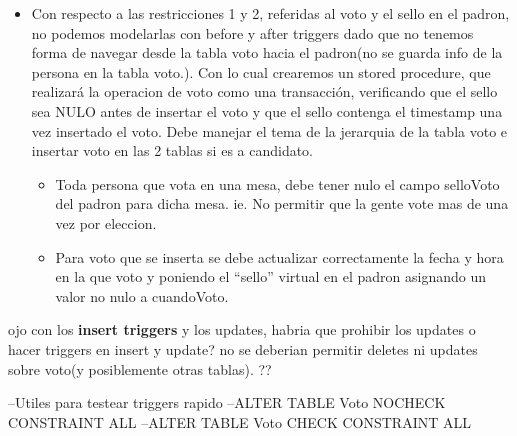 \begin{itemize}
	\item Con respecto a las restricciones 1 y 2, referidas al voto y el sello en el padron, no podemos modelarlas con before y after triggers dado que no tenemos forma de navegar desde la tabla voto hacia el padron(no se guarda info de la persona en la tabla voto.). Con lo cual crearemos un stored procedure, que realizará la operacion de voto como una transacción, verificando que el sello sea NULO antes de insertar el voto y que el sello contenga el timestamp una vez insertado el voto. Debe manejar el tema de la jerarquia de la tabla voto e insertar voto en las 2 tablas si es a candidato.
		\begin{itemize}
			\item Toda persona que vota en una mesa, debe tener nulo el campo selloVoto del padron para dicha mesa. ie. No permitir que la gente vote mas de una vez por eleccion.
			\item Para voto que se inserta se debe actualizar correctamente la fecha y hora en la que voto y poniendo el “sello” virtual en el padron asignando un valor no nulo a cuandoVoto.
		\end{itemize}

\end{itemize}



ojo con los \textbf{insert triggers} y los updates, habria que prohibir los updates o hacer triggers en insert y update?
no se deberian permitir deletes ni updates sobre voto(y posiblemente otras tablas). ??


--Utiles para testear triggers rapido
--ALTER TABLE Voto NOCHECK CONSTRAINT ALL
--ALTER TABLE Voto CHECK CONSTRAINT ALL